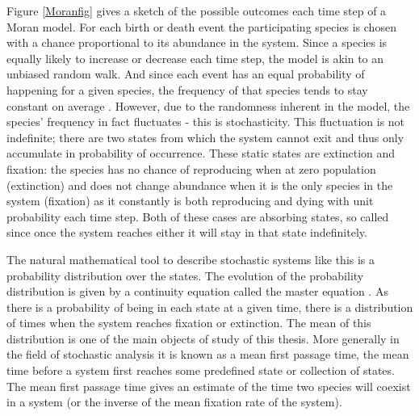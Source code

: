 Figure \ref{Moranfig} gives a sketch of the possible outcomes each time step of a Moran model. 
For each birth or death event the participating species is chosen with a chance proportional to its abundance in the system. 
Since a species is equally likely to increase or decrease each time step, the model is akin to an unbiased random walk. %
And since each event has an equal probability of happening for a given species, the frequency of that species tends to stay constant on average \cite{Kimura1955,Moran1962}. 
However, due to the randomness inherent in the model, the species' frequency in fact fluctuates - this is stochasticity. 
This fluctuation is not indefinite; there are two states from which the system cannot exit and thus only accumulate in probability of occurrence. 
These static states are extinction and fixation: the species has no chance of reproducing when at zero population (extinction) and does not change abundance when it is the only species in the system (fixation) as it constantly is both reproducing and dying with unit probability each time step. 
Both of these cases are absorbing states, so called since once the system reaches either it will stay in that state indefinitely. 

The natural mathematical tool to describe stochastic systems like this is a probability distribution over the states. 
The evolution of the probability distribution is given by a continuity equation called the master equation \cite{Nisbet1982,Gardiner2004,Iyer-Biswas2015}. 
As there is a probability of being in each state at a given time, there is a distribution of times when the system reaches fixation or extinction. 
The mean of this distribution is one of the main objects of study of this thesis. 
More generally in the field of stochastic analysis it is known as a mean first passage time, the mean time before a system first reaches some predefined state or collection of states. 
The mean first passage time gives an estimate of the time two species will coexist in a system (or the inverse of the mean fixation rate of the system). 

